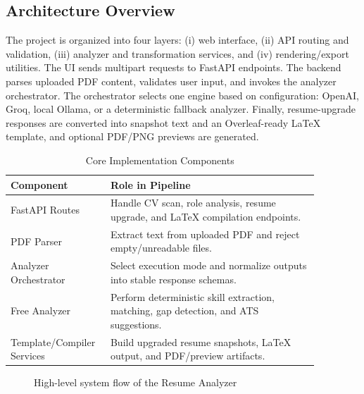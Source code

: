 \documentclass[conference]{IEEEtran}
\begin{document}
\subsection{Architecture Overview}
The project is organized into four layers: (i) web interface, (ii) API routing and validation, (iii) analyzer and transformation services, and (iv) rendering/export utilities. The UI sends multipart requests to FastAPI endpoints. The backend parses uploaded PDF content, validates user input, and invokes the analyzer orchestrator. The orchestrator selects one engine based on configuration: OpenAI, Groq, local Ollama, or a deterministic fallback analyzer. Finally, resume-upgrade responses are converted into snapshot text and an Overleaf-ready LaTeX template, and optional PDF/PNG previews are generated.

\begin{table}[htbp]
\caption{Core Implementation Components}
\label{tab:components}
\centering
\footnotesize
\begin{tabular}{p{0.24\linewidth} p{0.63\linewidth}}
\toprule
\textbf{Component} & \textbf{Role in Pipeline} \\
\midrule
FastAPI Routes & Handle CV scan, role analysis, resume upgrade, and LaTeX compilation endpoints. \\
PDF Parser & Extract text from uploaded PDF and reject empty/unreadable files. \\
Analyzer Orchestrator & Select execution mode and normalize outputs into stable response schemas. \\
Free Analyzer & Perform deterministic skill extraction, matching, gap detection, and ATS suggestions. \\
Template/Compiler Services & Build upgraded resume snapshots, LaTeX output, and PDF/preview artifacts. \\
\bottomrule
\end{tabular}
\end{table}

\begin{figure}[htbp]
\centering
{}
\caption{High-level system flow of the Resume Analyzer}
\label{fig:system_flow}
\end{figure}
\end{document}
